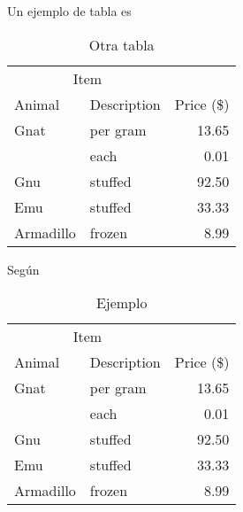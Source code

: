 

Un ejemplo de tabla es

\begin{table}
  \centering
\begin{tabular}{llr}
 \toprule
\multicolumn{2}{c}{Item} \\
\cmidrule(r){1-2}
Animal & Description & Price (\$) \\
\midrule
Gnat  & per gram & 13.65 \\
      & each     &  0.01 \\
Gnu   & stuffed  & 92.50 \\
Emu   & stuffed  & 33.33 \\
Armadillo & frozen & 8.99 \\
\bottomrule
\end{tabular}

  \caption{Otra tabla}\label{Tab:otra}
\end{table}


Según \cite{Hvattum200931}


\begin{table}
  \centering
  \caption{Ejemplo}\label{Tab:producion}
\begin{tabular}{llr}
\toprule
\multicolumn{2}{c}{Item} \\
\cmidrule(r){1-2}
Animal & Description & Price (\$) \\
\midrule
Gnat  & per gram & 13.65 \\
      & each     &  0.01 \\
Gnu   & stuffed  & 92.50 \\
Emu   & stuffed  & 33.33 \\
Armadillo & frozen & 8.99 \\
\bottomrule
\end{tabular}
\end{table}
